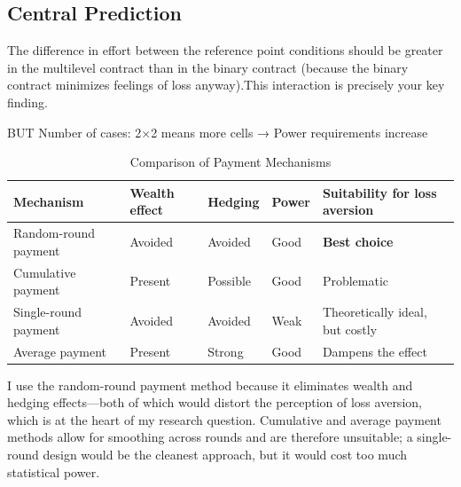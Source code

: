 \documentclass[
    11pt,
    a4paper,
    parskip=half,
    headings=normal
]{scrartcl}
\numberwithin{equation}{section}
\theoremstyle{definition}
\theoremstyle{remark}
\begin{document}
\subsection*{Central Prediction}

The difference in effort between the reference point conditions should be greater in the multilevel contract than in the binary contract (because the binary contract minimizes feelings of loss anyway).This interaction is precisely your key finding.

\medskip

BUT Number of cases: 2×2 means more cells → Power requirements increase

\vspace{0.5cm}

\begin{table}[htbp]
    \centering
    \caption{Comparison of Payment Mechanisms}
    \label{tab:payment_mechanisms}
    \small
    \renewcommand{\arraystretch}{1.25}
    \begin{tabularx}{\textwidth}{
        >{\raggedright\arraybackslash}p{}
        >{\centering\arraybackslash}p{}
        >{\centering\arraybackslash}p{}
        >{\centering\arraybackslash}p{}
        >{\raggedright\arraybackslash}X
    }
        \toprule
        \textbf{Mechanism}
        & \textbf{Wealth effect}
        & \textbf{Hedging}
        & \textbf{Power}
        & \textbf{Suitability for loss aversion} \\
        \midrule

        Random-round payment
        & Avoided
        & Avoided
        & Good
        & \textbf{Best choice} \\

        Cumulative payment
        & Present
        & Possible
        & Good
        & Problematic \\

        Single-round payment
        & Avoided
        & Avoided
        & Weak
        & Theoretically ideal, but costly \\

        Average payment
        & Present
        & Strong
        & Good
        & Dampens the effect \\

        \bottomrule
    \end{tabularx}
\end{table}

I use the random-round payment method because it eliminates wealth and hedging effects—both of which would distort the perception of loss aversion, which is at the heart of my research question. Cumulative and average payment methods allow for smoothing across rounds and are therefore unsuitable; a single-round design would be the cleanest approach, but it would cost too much statistical power.
\end{document}
